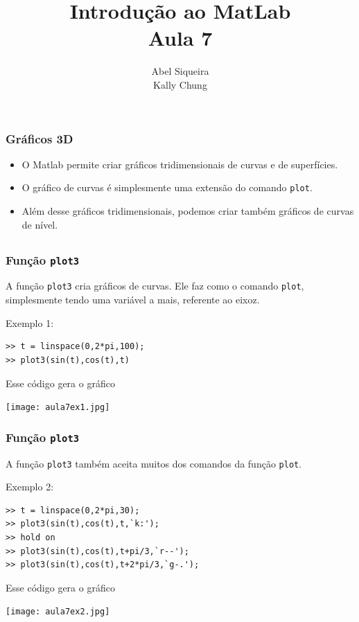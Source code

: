 \documentclass{beamer}
\title{Introdu\c{c}\~ao ao MatLab \\ Aula 7}
\author{Abel Siqueira \\ Kally Chung}
\date{}
\begin{document}
\frame{\titlepage}

\section[Gr\'aficos 3D]{}

\begin{frame}
\frametitle{Gr\'aficos 3D}

\begin{itemize}
 \item<1-> O Matlab permite criar gr\'aficos tridimensionais de curvas e de
superf\'icies.
 \item<2-> O gr\'afico de curvas \'e simplesmente uma extens\~ao do comando
{\tt plot}.
 \item<3-> Al\'em desse gr\'aficos tridimensionais, podemos criar tamb\'em
gr\'aficos de curvas de n\'ivel.
\end{itemize}

\end{frame}

\subsection[Fun\c{c}\~ao plot3]{}

\begin{frame}[fragile]
\frametitle{Fun\c{c}\~ao {\tt plot3}}
A fun\c{c}\~ao {\tt plot3} cria gr\'aficos de curvas. Ele faz como o comando
{\tt plot}, simplesmente tendo uma vari\'avel a mais, referente ao eixoz.

Exemplo 1:
{\scriptsize
\begin{verbatim}
>> t = linspace(0,2*pi,100);
>> plot3(sin(t),cos(t),t)
\end{verbatim}}
\pause
Esse c\'odigo gera o gr\'afico
\begin{center}
\texttt{[image: aula7ex1.jpg]}
\end{center}
\end{frame}

\begin{frame}[fragile]
\frametitle{Fun\c{c}\~ao {\tt plot3}}
A fun\c{c}\~ao {\tt plot3} tamb\'em aceita muitos dos comandos da fun\c{c}\~ao
{\tt plot}.

Exemplo 2:
{\scriptsize
\begin{verbatim}
>> t = linspace(0,2*pi,30);
>> plot3(sin(t),cos(t),t,`k:');
>> hold on
>> plot3(sin(t),cos(t),t+pi/3,`r--');
>> plot3(sin(t),cos(t),t+2*pi/3,`g-.');
\end{verbatim}}
\pause
Esse c\'odigo gera o gr\'afico
\begin{center}
\texttt{[image: aula7ex2.jpg]}
\end{center}
\end{frame}
\end{document}
